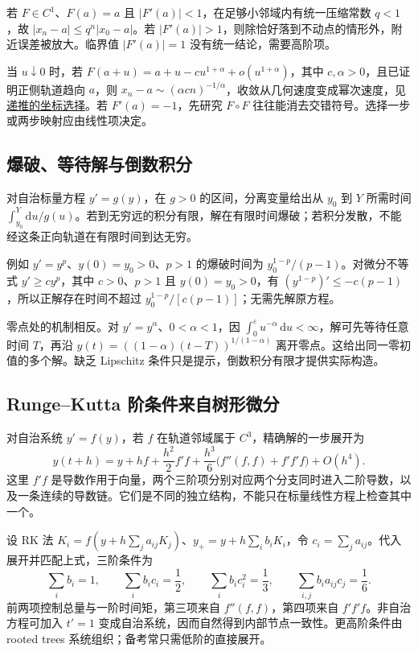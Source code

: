 \documentclass[UTF8,12pt,a4paper,fontset=fandol]{ctexart}
\begin{document}
若 $F\in C^1$、$F(a)=a$ 且 $|F'(a)|<1$，在足够小邻域内有统一压缩常数 $q<1$，故 $|x_n-a|\leq q^n|x_0-a|$。若 $|F'(a)|>1$，则除恰好落到不动点的情形外，附近误差被放大。临界值 $|F'(a)|=1$ 没有统一结论，需要高阶项。

当 $u\downarrow0$ 时，若 $F(a+u)=a+u-cu^{1+\alpha}+o(u^{1+\alpha})$，其中 $c,\alpha>0$，且已证明正侧轨道趋向 $a$，则 $x_n-a\sim(\alpha cn)^{-1/\alpha}$，收敛从几何速度变成幂次速度，见\hyperref[app:estimate-recursion]{递推的坐标选择}。若 $F'(a)=-1$，先研究 $F\circ F$ 往往能消去交错符号。选择一步或两步映射应由线性项决定。

\subsection{爆破、等待解与倒数积分}

\label{app:dynamics-blowup}

对自治标量方程 $y'=g(y)$，在 $g>0$ 的区间，分离变量给出从 $y_0$ 到 $Y$ 所需时间 $\int_{y_0}^Y\mathrm du/g(u)$。若到无穷远的积分有限，解在有限时间爆破；若积分发散，不能经这条正向轨道在有限时间到达无穷。

例如 $y'=y^p$、$y(0)=y_0>0$、$p>1$ 的爆破时间为 $y_0^{1-p}/(p-1)$。对微分不等式 $y'\geq cy^p$，其中 $c>0$、$p>1$ 且 $y(0)=y_0>0$，有 $(y^{1-p})'\leq-c(p-1)$，所以正解存在时间不超过 $y_0^{1-p}/[c(p-1)]$；无需先解原方程。

零点处的机制相反。对 $y'=y^\alpha$、$0<\alpha<1$，因 $\int_0^\varepsilon u^{-\alpha}\,\mathrm du<\infty$，解可先等待任意时间 $T$，再沿 $y(t)=((1-\alpha)(t-T))^{1/(1-\alpha)}$ 离开零点。这给出同一零初值的多个解。缺乏 Lipschitz 条件只是提示，倒数积分有限才提供实际构造。

\subsection{Runge–Kutta 阶条件来自树形微分}

\label{app:dynamics-rk}

对自治系统 $y'=f(y)$，若 $f$ 在轨道邻域属于 $C^3$，精确解的一步展开为
\[
y(t+h)=y+hf+\frac{h^2}{2}f'f
+\frac{h^3}{6}\bigl(f''(f,f)+f'f'f\bigr)+O(h^4).
\]
这里 $f'f$ 是导数作用于向量，两个三阶项分别对应两个分支同时进入二阶导数，以及一条连续的导数链。它们是不同的独立结构，不能只在标量线性方程上检查其中一个。

设 RK 法 $K_i=f(y+h\sum_ja_{ij}K_j)$、$y_+=y+h\sum_ib_iK_i$，令 $c_i=\sum_ja_{ij}$。代入展开并匹配上式，三阶条件为
\[
\sum_ib_i=1,\qquad\sum_ib_ic_i=\frac12,
\qquad\sum_ib_ic_i^2=\frac13,
\qquad\sum_{i,j}b_ia_{ij}c_j=\frac16.
\]
前两项控制总量与一阶时间矩，第三项来自 $f''(f,f)$，第四项来自 $f'f'f$。非自治方程可加入 $t'=1$ 变成自治系统，因而自然得到内部节点一致性。更高阶条件由 rooted trees 系统组织；备考常只需低阶的直接展开。
\end{document}
